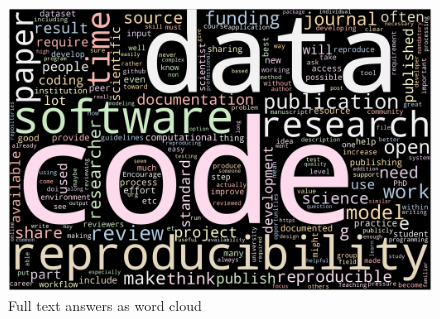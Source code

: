 \documentclass{article}
\begin{document}
\begin{figure}[!p]
    \centering
    \includegraphics[width=\textwidth]{../word_cloud.png}
	\caption{Full text answers as word cloud }
    \label{fig:wc}
\end{figure}
\end{document}
